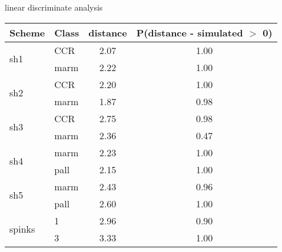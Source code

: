 \begin{subtable}[b]{0.3\textwidth}
  \caption{linear discriminate analysis}
  \centering
  \begin{tabular}{ l | l c c }
    \hline
    Scheme & Class & distance & P(distance - simulated \(>\) 0)\\ 
    \hline
    \hline
    \multirow{2}{*}{sh1} & CCR & 2.07 & 1.00 \\ 
    & marm & 2.22 & 1.00 \\ 
    \hline
    \multirow{2}{*}{sh2} & CCR & 2.20 & 1.00 \\ 
    & marm & 1.87 & 0.98 \\ 
    \hline
    \multirow{2}{*}{sh3} & CCR & 2.75 & 0.98 \\ 
    & marm & 2.36 & 0.47 \\ 
    \hline
    \multirow{2}{*}{sh4} & marm & 2.23 & 1.00 \\ 
    & pall & 2.15 & 1.00 \\ 
    \hline
    \multirow{2}{*}{sh5} & marm & 2.43 & 0.96 \\ 
    & pall & 2.60 & 1.00 \\ 
    \hline
    \multirow{2}{*}{spinks} & 1 & 2.96 & 0.90 \\ 
    & 3 & 3.33 & 1.00 \\ 
    \hline
  \end{tabular}
  \label{llmiss}
\end{subtable}
